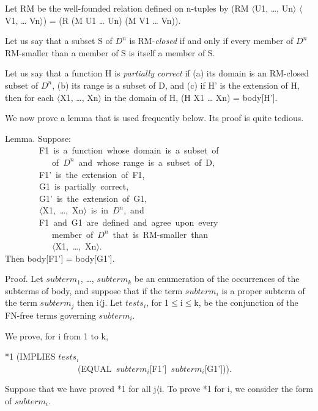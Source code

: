 \documentclass[10pt]{book}
\newenvironment{pubasis}{\begin{flushleft}}{\end{flushleft}}
\begin{document}
Let RM be the well-founded relation defined on n-tuples by
(RM $\langle$U1, \ldots{}, Un$\rangle$ $\langle$V1, \ldots{} Vn$\rangle$) = (R (M U1 \ldots{} Un) (M V1 \ldots{} Vn)).

Let us say that a subset S of $D^{n}$ is RM-\emph{closed} if and only
if every member of $D^{n}$ RM-smaller than a member of S is
itself a member of S.

Let us say that a function H is \emph{partially correct} if (a)
its domain is an RM-closed subset of $D^{n}$, (b) its range is a
subset of D, and (c) if H' is the extension of H, then for each
$\langle$X1, \ldots{}, Xn$\rangle$ in the domain of H, (H X1 \ldots{} Xn) = body[H'].

We now prove a lemma that is used frequently below.  Its proof
is quite tedious.

\begin{pubasis}
Lemma.  Suppose:\\

~~~~~~~~F1~is~a~function~whose~domain~is~a~subset~of\\
~~~~~~~~~~~of~$D^{n}$~and~whose~range~is~a~subset~of~D,\\
~~~~~~~~F1'~is~the~extension~of~F1,\\
~~~~~~~~G1~is~partially~correct,\\
~~~~~~~~G1'~is~the~extension~of~G1,\\
~~~~~~~~$\langle$X1,~\ldots{},~Xn$\rangle$~is~in~$D^{n}$,~and\\
~~~~~~~~F1~and~G1~are~defined~and~agree~upon~every\\
~~~~~~~~~~~member~of~$D^{n}$~that~is~RM-smaller~than\\
~~~~~~~~~~~$\langle$X1,~\ldots{},~Xn$\rangle$.\\

Then body[F1'] = body[G1'].\\
\end{pubasis}

Proof.  Let $subterm_{1}$, \ldots{}, $subterm_{k}$ be an enumeration of the
occurrences of the subterms of body, and suppose that if the term
$subterm_{i}$ is a proper subterm of the term $subterm_{j}$ then i$\langle$j.
Let $tests_{i}$, for 1$\leq$i$\leq$k, be the  conjunction of the FN-free
terms governing $subterm_{i}$.

We prove, for i from 1 to k,
\begin{pubasis}
*1	(IMPLIES $tests_{i}$\\
~~~~~~~~~~~~~~~~~(EQUAL~$subterm_{i}$[F1']~$subterm_{i}$[G1'])).\\
\end{pubasis}
Suppose that we have proved *1 for all j$\langle$i.  To prove *1 for i, we consider the form
of $subterm_{i}$.
\end{document}
